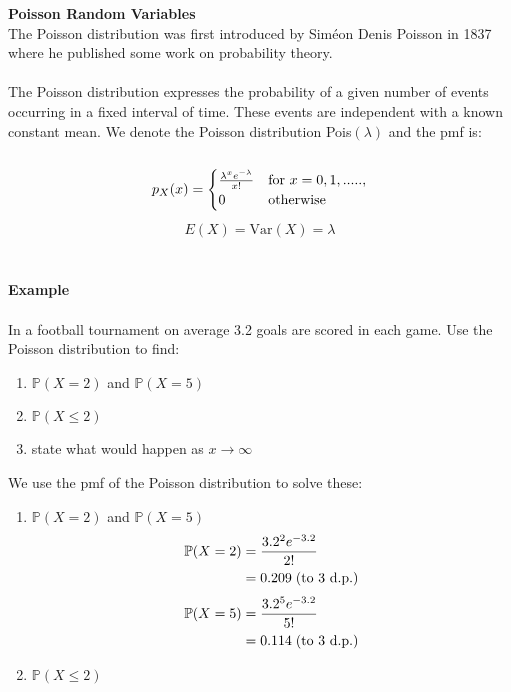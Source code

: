 \documentclass[,oneside]{article}
\begin{document}
\begin{enumerate}
\begin{enumerate}
\end{enumerate}
\textbf{Poisson Random Variables}\\
The Poisson distribution was first introduced by Siméon Denis Poisson in 1837 where he published some work on probability theory.\\ \\
The Poisson distribution expresses the probability of a given number of events occurring in a fixed interval of time. These events are independent with a known constant mean. We denote the Poisson distribution Pois$(\lambda)$ and the pmf is: \\ \\
\[
p_X(x)=
\begin{cases}
\frac{\lambda^x e^{-\lambda}}{x!} & \text{for }  x = 0, 1,....., \\
0 & $otherwise$
\end{cases} \] 
\begin{align*}
E(X)=\text{Var}(X)=\lambda
\end{align*}\\ \\
\textbf{Example}\\ \\
In a football tournament on average 3.2 goals are scored in each game. Use the Poisson distribution to find:\\
\begin{enumerate}
\item $\mathbb{P}(X=2)$ and $\mathbb{P}(X=5)$
\item $\mathbb{P}(X\leq 2)$
\item state what would happen as $x \rightarrow \infty$
\end{enumerate}
We use the pmf of the Poisson distribution to solve these:\\
\begin{enumerate}
\item $\mathbb{P}(X=2)$ and $\mathbb{P}(X=5)$
\begin{align*}
\mathbb{P}(X=2) &= \frac{3.2^{2} e^{-3.2}}{2!}\\
&=0.209 \hspace{0.1cm} \text{(to 3 d.p.)}
\end{align*}
\begin{align*}
\mathbb{P}(X=5) &= \frac{3.2^{5} e^{-3.2}}{5!}\\
&=0.114 \hspace{0.1cm} \text{(to 3 d.p.)}
\end{align*}
\item $\mathbb{P}(X\leq 2)$

\end{enumerate}
\end{enumerate}
\end{document}
